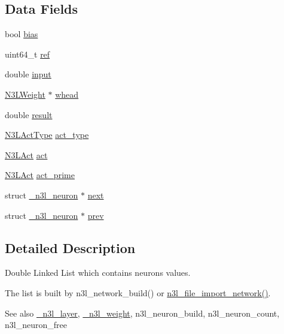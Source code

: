 \subsection*{Data Fields}
\begin{DoxyCompactItemize}
\item 
bool \hyperlink{struct__n3l__neuron_a0f3291ff81ab13111e538622ab662069}{bias}
\item 
uint64\+\_\+t \hyperlink{struct__n3l__neuron_aa0053e003b954df3b58853f003284958}{ref}
\item 
double \hyperlink{struct__n3l__neuron_ac896f5f8bd82c056cc61872120391048}{input}
\item 
\hyperlink{n3__header_8h_ac37c67a24ec253f5cd205cbc981922ca}{N3\+L\+Weight} $\ast$ \hyperlink{struct__n3l__neuron_ac9259a513822ea957c03430988adfa6a}{whead}
\item 
double \hyperlink{struct__n3l__neuron_afc9c38f4676dbe2ead749f8b6c81f491}{result}
\item 
\hyperlink{n3__header_8h_a3118e8995213ca26bd388c3d94cd8056}{N3\+L\+Act\+Type} \hyperlink{struct__n3l__neuron_af424e7accb8d1d089b828a1de69e03a0}{act\+\_\+type}
\item 
\hyperlink{n3__header_8h_afb10e6f7012513b51225a4d3add36cae}{N3\+L\+Act} \hyperlink{struct__n3l__neuron_a3ed17ddbe86d42ed6b7d31256b109262}{act}
\item 
\hyperlink{n3__header_8h_afb10e6f7012513b51225a4d3add36cae}{N3\+L\+Act} \hyperlink{struct__n3l__neuron_a9c9de65191cb097fd7a71752c83fc3db}{act\+\_\+prime}
\item 
struct \hyperlink{struct__n3l__neuron}{\+\_\+n3l\+\_\+neuron} $\ast$ \hyperlink{struct__n3l__neuron_a55f1bc3d589d69c5a940d0cb497610c4}{next}
\item 
struct \hyperlink{struct__n3l__neuron}{\+\_\+n3l\+\_\+neuron} $\ast$ \hyperlink{struct__n3l__neuron_a706ad4614fd4d1bd9a824f6ea8c0c9e5}{prev}
\end{DoxyCompactItemize}


\subsection{Detailed Description}
Double Linked List which contains neuron\textquotesingle{}s values. 

The list is built by n3l\+\_\+network\+\_\+build() or \hyperlink{n3__file_8c_a4fef76548ed87845dceafaa9527a83d0}{n3l\+\_\+file\+\_\+import\+\_\+network()}.

\begin{DoxySeeAlso}{See also}
\hyperlink{struct__n3l__layer}{\+\_\+n3l\+\_\+layer}, \hyperlink{struct__n3l__weight}{\+\_\+n3l\+\_\+weight}, n3l\+\_\+neuron\+\_\+build, n3l\+\_\+neuron\+\_\+count, n3l\+\_\+neuron\+\_\+free 
\end{DoxySeeAlso}


